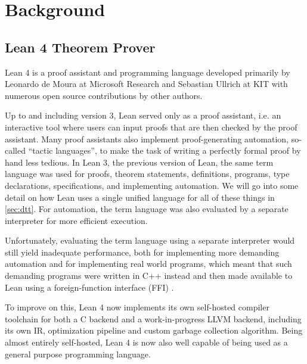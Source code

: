 \chapter{Background}\label{sec:background}

\section{Lean 4 Theorem Prover}\label{sec:lean4}
Lean 4 is a proof assistant and programming language developed primarily by Leonardo de Moura at Microsoft Research and Sebastian Ullrich at KIT with numerous open source contributions by other authors.

Up to and including version 3, Lean served only as a proof assistant, i.e. an interactive tool where users can input proofs that are then checked by the proof assistant. Many proof assistants also implement proof-generating automation, so-called ``tactic languages'', to make the task of writing a perfectly formal proof by hand less tedious. In Lean 3, the previous version of Lean, the same term language was used for proofs, theorem statements, definitions, programs, type declarations, specifications, and implementing automation. We will go into some detail on how Lean uses a single unified language for all of these things in \cref{sec:dtt}. For automation, the term language was also evaluated by a separate interpreter for more efficient execution.

Unfortunately, evaluating the term language using a separate interpreter would still yield inadequate performance, both for implementing more demanding automation and for implementing real world programs, which meant that such demanding programs were written in C++ instead and then made available to Lean using a foreign-function interface (FFI) \citep{ullrich_counting_2020}.

To improve on this, Lean 4 now implements its own self-hosted compiler toolchain for both a C backend and a work-in-progress LLVM backend, including its own IR, optimization pipeline and custom garbage collection algorithm. Being almost entirely self-hosted, Lean 4 is now also well capable of being used as a general purpose programming language.

